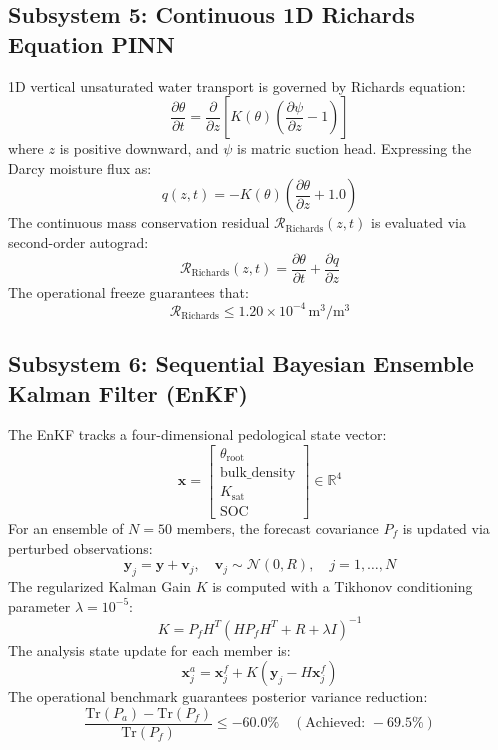 \documentclass[11pt,a4paper]{article}
\theoremstyle{definition}
\theoremstyle{remark}
\begin{document}
\subsection{Subsystem 5: Continuous 1D Richards Equation PINN}
1D vertical unsaturated water transport is governed by Richards equation:
\begin{equation}
    \frac{\partial \theta}{\partial t} = \frac{\partial}{\partial z} \left[K(\theta) \left(\frac{\partial \psi}{\partial z} - 1\right)\right]
\end{equation}
where $z$ is positive downward, and $\psi$ is matric suction head. Expressing the Darcy moisture flux as:
\begin{equation}
    q(z, t) = -K(\theta) \left(\frac{\partial \theta}{\partial z} + 1.0\right)
\end{equation}
The continuous mass conservation residual $\mathcal{R}_{\text{Richards}}(z, t)$ is evaluated via second-order autograd:
\begin{equation}
    \mathcal{R}_{\text{Richards}}(z, t) = \frac{\partial \theta}{\partial t} + \frac{\partial q}{\partial z}
\end{equation}
The operational freeze guarantees that:
\begin{equation}
    \mathcal{R}_{\text{Richards}} \le 1.20 \times 10^{-4}\,\text{m}^3/\text{m}^3
\end{equation}

\subsection{Subsystem 6: Sequential Bayesian Ensemble Kalman Filter (EnKF)}
The EnKF tracks a four-dimensional pedological state vector:
\begin{equation}
    \mathbf{x} = \begin{bmatrix} \theta_{\text{root}} \\ \text{bulk\_density} \\ K_{\text{sat}} \\ \text{SOC} \end{bmatrix} \in \mathbb{R}^4
\end{equation}
For an ensemble of $N = 50$ members, the forecast covariance $P_f$ is updated via perturbed observations:
\begin{equation}
    \mathbf{y}_j = \mathbf{y} + \mathbf{v}_j, \quad \mathbf{v}_j \sim \mathcal{N}(0, R), \quad j = 1, \dots, N
\end{equation}
The regularized Kalman Gain $K$ is computed with a Tikhonov conditioning parameter $\lambda = 10^{-5}$:
\begin{equation}
    K = P_f H^T \left(H P_f H^T + R + \lambda I\right)^{-1}
\end{equation}
The analysis state update for each member is:
\begin{equation}
    \mathbf{x}_j^a = \mathbf{x}_j^f + K \left(\mathbf{y}_j - H \mathbf{x}_j^f\right)
\end{equation}
The operational benchmark guarantees posterior variance reduction:
\begin{equation}
    \frac{\text{Tr}(P_a) - \text{Tr}(P_f)}{\text{Tr}(P_f)} \le -60.0\% \quad (\text{Achieved: } -69.5\%)
\end{equation}
\end{document}
